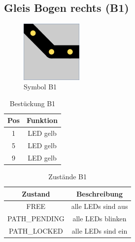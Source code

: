 \documentclass[10pt,a4paper]{article}
\begin{document}
\subsection{Gleis Bogen rechts (B1)}
\begin{figure}[hbtp]
\centering
\includegraphics[width=3cm]{../folien/b1.png}
\caption{Symbol B1}
\end{figure}
\begin{table}[h!]
\centering
\begin{tabular}{c|c}
\textbf{Pos} & \textbf{Funktion} \\ \hline
1 & LED gelb \\
5 & LED gelb \\
9 & LED gelb
\end{tabular}
\caption{Bestückung B1}
\end{table}
\begin{table}[h!]
\centering
\begin{tabular}{c|c}
\textbf{Zustand} & \textbf{Beschreibung} \\ \hline
FREE & alle LEDs sind aus \\
PATH\_PENDING & alle LEDs blinken \\
PATH\_LOCKED & alle LEDs sind ein
\end{tabular}
\caption{Zustände B1}
\end{table}


\newpage
\end{document}
